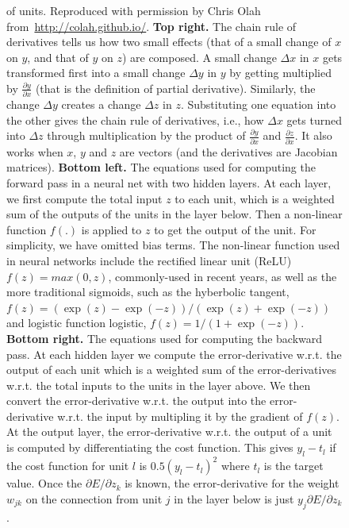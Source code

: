 \documentclass[10pts]{article}
\begin{document}
\begin{figure}[htp]
{\begin{minipage}{\textwidth}
{of units. Reproduced with permission by Chris Olah from~\url{http://colah.github.io/}.
\newline
{\bf Top right.} The chain rule of derivatives tells us how
two small effects (that of a small change of $x$ on $y$, and that of $y$ on $z$)
are composed. A small change $\Delta x$ in $x$
gets transformed first into a small change $\Delta y$ in $y$
by getting multiplied by $\frac{\partial y}{\partial x}$
(that is the definition of partial derivative). Similarly,
the change $\Delta y$ creates a change $\Delta z$ in $z$. Substituting one equation
into the other gives the chain rule of derivatives, i.e., how
$\Delta x$ gets turned into $\Delta z$ through multiplication
by the product of $\frac{\partial y}{\partial x}$ and
$\frac{\partial z}{\partial x}$. It also works when $x$, $y$
and $z$ are vectors (and the derivatives are Jacobian matrices). 
\newline
{\bf Bottom left.} 
The equations used for computing the forward pass in a neural
net with two hidden layers. At each layer, we first compute the total
input $z$ to each unit, which is a weighted sum of the outputs of the
units in the layer below. Then a non-linear function $f(.)$ is applied
to $z$ to get the output of the unit.  For simplicity, we have omitted
bias terms. The non-linear function used in neural networks include 
the rectified linear unit (ReLU) $f(z) = max(0, z)$, commonly-used in 
recent years, as well as the more traditional sigmoids, such as the 
hyberbolic tangent, $f(z) = (\exp(z)-\exp(-z))/(\exp(z)+\exp(-z))$ 
and logistic function logistic, $f(z) = 1/(1+\exp(-z))$.
{\bf Bottom right.} 
The equations used for computing the backward pass. At each
hidden layer we compute the error-derivative w.r.t. the output of each
unit which is a weighted sum of the error-derivatives w.r.t. the total
inputs to the units in the layer above. We then convert the
error-derivative w.r.t. the output into the error-derivative w.r.t.
the input by multipling it by the gradient of $f(z)$.  At the output
layer, the error-derivative w.r.t. the output of a unit is computed by
differentiating the cost function. This gives $y_l-t_l$ if the cost
function for unit $l$ is $0.5(y_l-t_l)^2$ where $t_l$ is the target
value. Once the $\partial E/\partial z_k$ is known, the
error-derivative for the weight $w_{jk}$ on the connection from unit
$j$ in the layer below is just $y_j \partial E/\partial z_k$.
}
\label{fig:backprop-box}
\end{minipage}
}
\end{figure}
\end{document}
